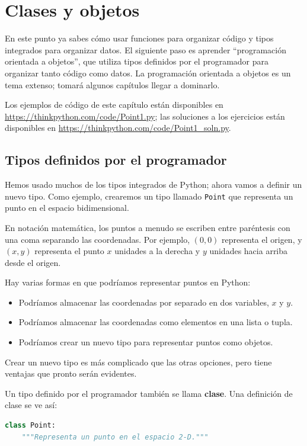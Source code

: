 \chapter{Clases y objetos}

En este punto ya sabes cómo usar funciones para organizar código y tipos integrados para organizar datos. El siguiente paso es aprender ``programación orientada a objetos'', que utiliza tipos definidos por el programador para organizar tanto código como datos. La programación orientada a objetos es un tema extenso; tomará algunos capítulos llegar a dominarlo.

Los ejemplos de código de este capítulo están disponibles en \url{https://thinkpython.com/code/Point1.py}; las soluciones a los ejercicios están disponibles en \url{https://thinkpython.com/code/Point1_soln.py}.

\section{Tipos definidos por el programador}

Hemos usado muchos de los tipos integrados de Python; ahora vamos a definir un nuevo tipo. Como ejemplo, crearemos un tipo llamado \texttt{Point} que representa un punto en el espacio bidimensional.

En notación matemática, los puntos a menudo se escriben entre paréntesis con una coma separando las coordenadas. Por ejemplo, $(0,0)$ representa el origen, y $(x,y)$ representa el punto $x$ unidades a la derecha y $y$ unidades hacia arriba desde el origen.

Hay varias formas en que podríamos representar puntos en Python:

\begin{itemize}
    \item Podríamos almacenar las coordenadas por separado en dos variables, $x$ y $y$.
    \item Podríamos almacenar las coordenadas como elementos en una lista o tupla.
    \item Podríamos crear un nuevo tipo para representar puntos como objetos.
\end{itemize}

Crear un nuevo tipo es más complicado que las otras opciones, pero tiene ventajas que pronto serán evidentes.

Un tipo definido por el programador también se llama \textbf{clase}. Una definición de clase se ve así:

\begin{lstlisting}[language=Python]
class Point:
    """Representa un punto en el espacio 2-D."""
\end{lstlisting}

